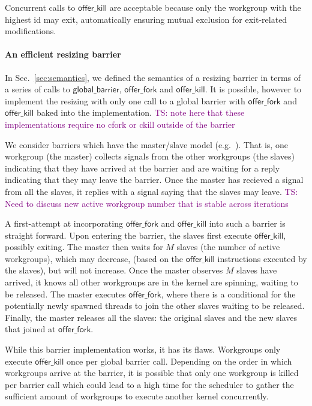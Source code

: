 \documentclass[numbers,nocopyrightspace,10pt]{sigplanconf}
\newcommand{\TSComment}[1]{\textcolor{purple}{TS: #1}}
\newcommand{\mysec}{Sec.~}
\newcommand{\offerfork}{\mathsf{offer\_fork}}
\newcommand{\offerkill}{\mathsf{offer\_kill}}
\newcommand{\globalbarrier}{\mathsf{global\_barrier}}
\begin{document}
Concurrent calls to $\offerkill$ are acceptable because only the
workgroup with the highest id may exit, automatically ensuring mutual
exclusion for exit-related modifications.

\paragraph{An efficient resizing barrier}

In \mysec\ref{sec:semantics}, we defined the semantics of a resizing barrier in terms
of a series of calls to $\globalbarrier$, $\offerfork$ and $\offerkill$.
 It is possible, however to implement the resizing with
only one call to a global barrier with $\offerfork$ and $\offerkill$
baked into the implementation. \TSComment{note here that these
  implementations require no cfork or ckill outside of the barrier}

We consider barriers which have the master/slave model
(e.g.\ \cite{XF10}). That is, one workgroup (the master) collects signals
from the other workgroups (the slaves) indicating that they have
arrived at the barrier and are waiting for a reply indicating that
they may leave the barrier. Once the master has recieved a signal from
all the slaves, it replies with a signal saying that the slaves may
leave. \TSComment{Need to discuss new active workgroup number that
is stable across iterations}

A first-attempt at incorporating $\offerfork$ and $\offerkill$ into
such a barrier is straight forward. Upon entering the barrier, the
slaves first execute $\offerkill$, possibly exiting. The master then
waits for $M$ slaves (the number of active workgroups), which may
decrease, (based on the $\offerkill$ instructions executed by the
slaves), but will not increase. Once the master observes $M$ slaves
have arrived, it knows all other workgroups are in the kernel are
spinning, waiting to be released. The master executes $\offerfork$,
where there is a conditional for the potentially newly spawned threads
to join the other slaves waiting to be released. Finally, the master
releases all the slaves: the original slaves and the new slaves that
joined at $\offerfork$.

While this barrier implementation works, it has its flaws. Workgroups
only execute $\offerkill$ once per global barrier call. Depending on
the order in which workgroups arrive at the barrier, it is possible
that only one workgroup is killed per barrier call which could lead to
a high time for the scheduler to gather the sufficient amount of
workgroups to execute another kernel concurrently.
\end{document}
